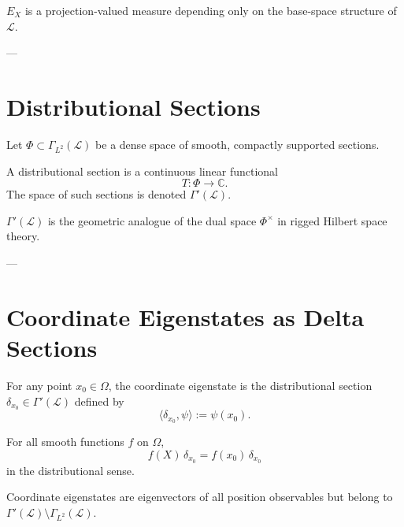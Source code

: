 \documentclass[11pt]{article}
\begin{document}
\begin{proposition}
$E_X$ is a projection-valued measure depending only on the base-space structure
of $\mathcal L$.
\end{proposition}

---

\section{Distributional Sections}

\begin{definition}
Let $\Phi \subset \Gamma_{L^2}(\mathcal L)$ be a dense space of smooth,
compactly supported sections.
\end{definition}

\begin{definition}
A distributional section is a continuous linear functional
\[
T : \Phi \to \mathbb C.
\]
The space of such sections is denoted $\Gamma'(\mathcal L)$.
\end{definition}

\begin{remark}
$\Gamma'(\mathcal L)$ is the geometric analogue of the dual space
$\Phi^\times$ in rigged Hilbert space theory.
\end{remark}

---

\section{Coordinate Eigenstates as Delta Sections}

\begin{definition}
For any point $x_0 \in \Omega$, the coordinate eigenstate is the
distributional section $\delta_{x_0} \in \Gamma'(\mathcal L)$ defined by
\[
\langle \delta_{x_0}, \psi \rangle := \psi(x_0).
\]
\end{definition}

\begin{theorem}
For all smooth functions $f$ on $\Omega$,
\[
f(X)\,\delta_{x_0} = f(x_0)\,\delta_{x_0}
\]
in the distributional sense.
\end{theorem}

\begin{corollary}
Coordinate eigenstates are eigenvectors of all position observables
but belong to $\Gamma'(\mathcal L)\setminus\Gamma_{L^2}(\mathcal L)$.
\end{corollary}
\end{document}
